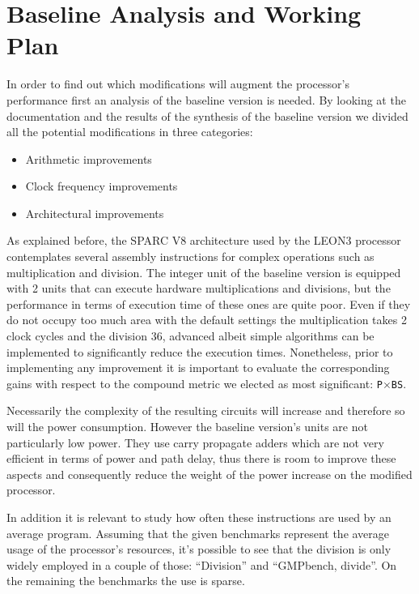 \section{Baseline Analysis and Working Plan}
\label{sec:baseline}
In order to find out which modifications will augment the processor's performance first an analysis of the baseline version is needed.
By looking at the documentation and the results of the synthesis of the baseline version we divided all the potential modifications in three categories:

\begin{itemize}
  \item Arithmetic improvements
  \item Clock frequency improvements
  \item Architectural improvements
\end{itemize}

As explained before, the SPARC V8 architecture used by the LEON3 processor contemplates several assembly instructions for complex operations such as multiplication and division.
The integer unit of the baseline version is equipped with 2 units that can execute hardware multiplications and divisions, but the performance in terms of execution time of these ones are quite poor.
Even if they do not occupy too much area with the default settings the multiplication takes 2 clock cycles and the division 36, advanced albeit simple algorithms can be implemented to significantly reduce the execution times.
Nonetheless, prior to implementing any improvement it is important to evaluate the corresponding gains with respect to the compound metric we elected as most significant: \texttt{P}$\times$\texttt{BS}.

Necessarily the complexity of the resulting circuits will increase and therefore so will the power consumption. However the baseline version's units are not particularly low power. They use carry propagate adders which are not very efficient in terms of power and path delay, thus there is room to improve these aspects and consequently reduce the weight of the power increase on the modified processor.

In addition it is relevant to study how often these instructions are used by an average program.
Assuming that the given benchmarks represent the average usage of the processor's resources, it's possible to see that the division is only widely employed in a couple of those: ``Division'' and ``GMPbench, divide''. On the remaining the benchmarks the use is sparse.


